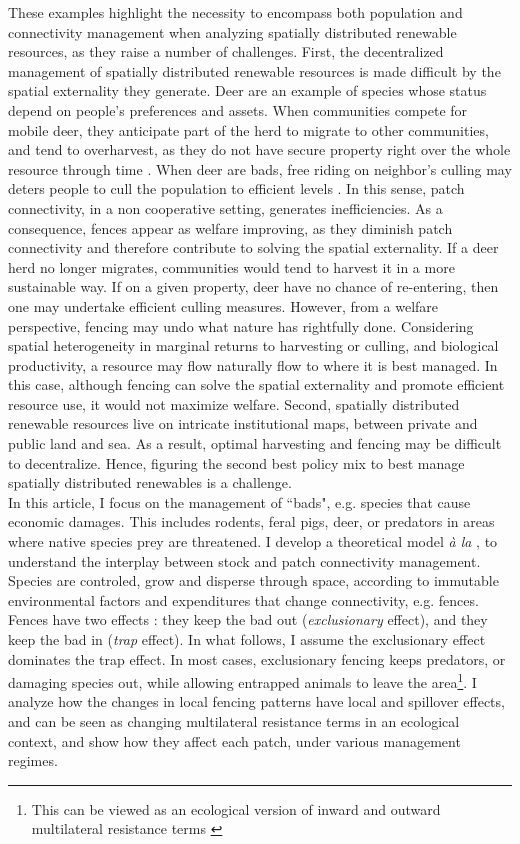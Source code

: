 These examples highlight the necessity to encompass both population and connectivity management when analyzing spatially distributed renewable resources, as they raise a number of challenges. 
First, the decentralized management of spatially distributed renewable resources is made difficult by the spatial externality they generate. Deer are an example of species whose status depend on people's preferences and assets. When communities compete for mobile deer, they anticipate part of the herd to migrate to other communities, and tend to overharvest, as they do not have secure property right over the whole resource through time \citep{kaffine_unitization_2010}. When deer are bads, free riding on neighbor's culling may deters people to cull the population to efficient levels \citep{costello_private_2017}. In this sense, patch connectivity, in a non cooperative setting, generates inefficiencies. As a consequence, fences appear as welfare improving, as they diminish patch connectivity and therefore contribute to solving the spatial externality. If a deer herd no longer migrates, communities would tend to harvest it in a more sustainable way. If on a given property, deer have no chance of re-entering, then one may undertake efficient culling measures. However, from a welfare perspective, fencing may undo what nature has rightfully done. Considering spatial heterogeneity in marginal returns to harvesting or culling, and biological productivity, a resource may flow naturally flow to where it is best managed. In this case, although fencing can solve the spatial externality and promote efficient resource use, it would not maximize welfare. Second,  spatially distributed renewable resources live on intricate institutional maps, between private and public land and sea. As a result, optimal harvesting and fencing may be difficult to decentralize. Hence, figuring the second best policy mix to best manage spatially distributed renewables is a challenge. \\
In this article, I focus on the management of ``bads", e.g. species that cause economic damages. This includes rodents, feral pigs, deer, or predators in areas where native species prey are threatened. I develop a theoretical model \textit{à la }\cite{costello_private_2017}, to understand the interplay between stock and patch connectivity management. Species are controled, grow and disperse through space, according to immutable environmental factors and expenditures that change connectivity, e.g. fences. Fences have two effects : they keep the bad out (\textit{exclusionary} effect), and they keep the bad in (\textit{trap} effect). In what follows, I assume the exclusionary effect dominates the trap effect. In most cases, exclusionary fencing keeps predators, or damaging species out, while allowing entrapped animals to leave the area\footnote{This can be viewed as an ecological version of inward and outward multilateral resistance terms \citep{anderson_gravity_2003}}. I analyze how the changes in local fencing patterns have local and spillover effects, and can be seen as changing multilateral resistance terms in an ecological context, and show how they affect each patch, under various management regimes. 
